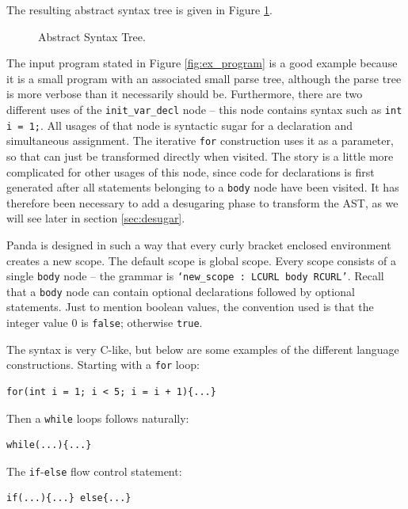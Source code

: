 The resulting abstract syntax tree is given in Figure \ref{fig:AST}.

\begin{figure}[H]
    \centering
    
    \caption{Abstract Syntax Tree.} 
    \label{fig:AST}
\end{figure}

The input program stated in Figure \ref{fig:ex_program} is a good example because it is a small program with an associated small parse tree, although the parse tree is more verbose than it necessarily should be. Furthermore, there are two different uses of the \texttt{init\_var\_decl} node -- this node contains syntax such as \texttt{int i = 1;}. All usages of that node is syntactic sugar for a declaration and simultaneous assignment. The iterative \texttt{for} construction uses it as a parameter, so that can just be transformed directly when visited. The story is a little more complicated for other usages of this node, since code for declarations is first generated after all statements belonging to a \texttt{body} node have been visited. It has therefore been necessary to add a desugaring phase to transform the AST, as we will see later in section \ref{sec:desugar}.

Panda is designed in such a way that every curly bracket enclosed environment creates a new scope. The default scope is global scope. Every scope consists of a single \texttt{body} node -- the grammar is \texttt{`new\_scope : LCURL body RCURL'}. Recall that a \texttt{body} node can contain optional declarations followed by optional statements. Just to mention boolean values, the convention used is that the integer value $0$ is \texttt{false}; otherwise \texttt{true}.

The syntax is very C-like, but below are some examples of the different language constructions. Starting with a \texttt{for} loop:

\begin{verbatim}
for(int i = 1; i < 5; i = i + 1){...}
\end{verbatim}

Then a \texttt{while} loops follows naturally:

\begin{verbatim}
while(...){...}
\end{verbatim}

The \texttt{if}-\texttt{else} flow control statement:

\begin{verbatim}
if(...){...} else{...}
\end{verbatim}

